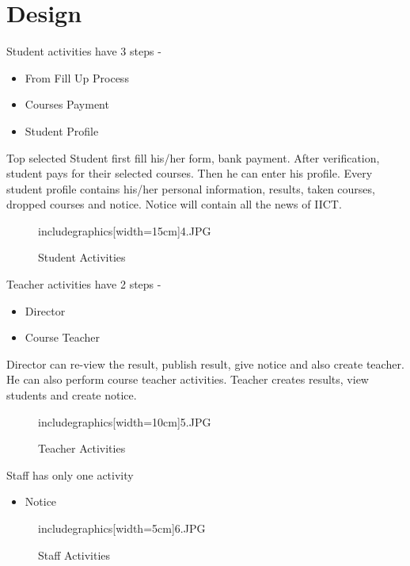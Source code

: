 \documentclass{scrreprt}
\begin{document}
    \section{Design}
    Student activities have 3 steps -
    \begin{itemize}
        \item From Fill Up Process
        \item Courses Payment
        \item Student Profile
    \end{itemize}
    Top selected Student first fill his/her form, bank payment. After verification, student pays for their selected courses. Then he can enter his profile. 
    \newline
    Every student profile contains his/her personal information, results, taken courses, dropped courses and notice.
    \newline
    Notice will contain all the news of IICT.
    
    \begin{figure}[h!]
        \centering
        includegraphics[width=15cm]{4.JPG}
        \caption{Student Activities}
        \label{fig:Students Activites}
    \end{figure}
    \newpage
    Teacher activities have 2 steps - 
    \begin{itemize}
        \item Director
        \item Course Teacher
    \end{itemize}
    Director can re-view the result, publish result, give notice and also create teacher. He can also perform course teacher activities.
    \newline
    Teacher creates results, view students and create notice.
    \newline
    \begin{figure}[h!]
        \centering
        includegraphics[width=10cm]{5.JPG}
        \caption{Teacher Activities}
        \label{fig:Teacher Activities}
    \end{figure}
    \newline
    Staff has only one activity 
    \begin{itemize}
        \item Notice
    \end{itemize} 
    \begin{figure}[h!]
        \centering
        includegraphics[width=5cm]{6.JPG}
        \caption{Staff Activities}
        \label{fig:Staff Activities}
    \end{figure}
    
\end{document}
